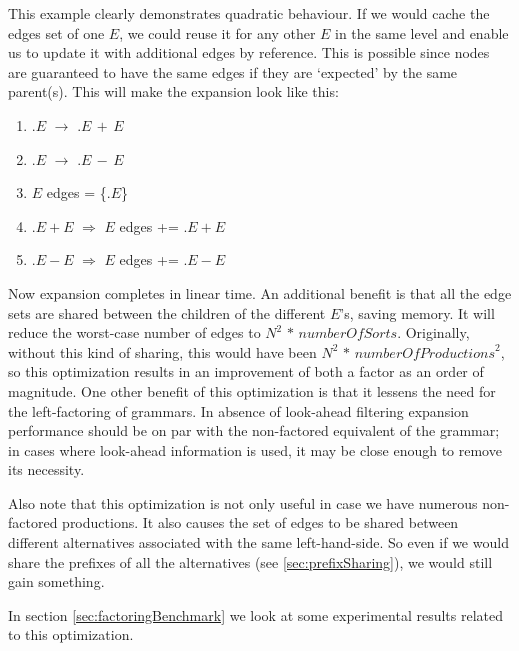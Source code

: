 \documentclass[a4paper,10pt]{article}
\begin{document}
This example clearly demonstrates quadratic behaviour. If we would cache the edges set of one $E$, we could reuse it for any other $E$ in the same level and enable us to update it with additional edges by reference. This is possible since nodes are guaranteed to have the same edges if they are `expected' by the same parent(s). This will make the expansion look like this:
\begin{enumerate}
 \setlength{\itemsep}{0pt}
 \setlength{\parskip}{0pt}
 \setlength{\parsep}{0pt}
 
 \item $.E$ $\rightarrow$ $.E\,+\,E$
 \item $.E$ $\rightarrow$ $.E\,-\,E$
 \item $E$ edges = \{$.E$\}
 \item $.E+E$ $\Rightarrow$ $E$ edges += $.E+E$
 \item $.E-E$ $\Rightarrow$ $E$ edges += $.E-E$
\end{enumerate}
Now expansion completes in linear time. An additional benefit is that all the edge sets are shared between the children of the different $E$'s, saving memory. It will reduce the worst-case number of edges to $N^2\,*\,\mathit{numberOfSorts}$. Originally, without this kind of sharing, this would have been $N^2\,*\,\mathit{numberOfProductions}^2$, so this optimization results in an improvement of both a factor as an order of magnitude. One other benefit of this optimization is that it lessens the need for the left-factoring of grammars. In absence of look-ahead filtering expansion performance should be on par with the non-factored equivalent of the grammar; in cases where look-ahead information is used, it may be close enough to remove its necessity.

Also note that this optimization is not only useful in case we have numerous non-factored productions. It also causes the set of edges to be shared between different alternatives associated with the same left-hand-side. So even if we would share the prefixes of all the alternatives (see \ref{sec:prefixSharing}), we would still gain something.

In section \ref{sec:factoringBenchmark} we look at some experimental results related to this optimization.
\end{document}
